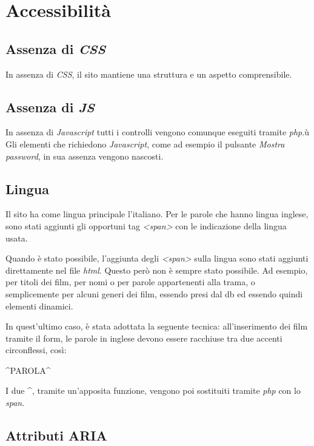 \documentclass[a4paper]{article}
\begin{document}
\section{Accessibilità}

\subsection{Assenza di \textit{CSS}}
In assenza di \textit{CSS}, il sito mantiene una struttura e un aspetto comprensibile.

\subsection{Assenza di \textit{JS}}
In assenza di \textit{Javascript} tutti i controlli vengono comunque eseguiti tramite \textit{php}.ù
Gli elementi che richiedono \textit{Javascript}, come ad esempio il pulsante \textit{Mostra password}, in sua assenza vengono nascosti.

\subsection{Lingua}

Il sito ha come lingua principale l'italiano. Per le parole che hanno lingua inglese, sono stati aggiunti gli opportuni tag \textit{<span>} con le indicazione della lingua usata.

Quando è stato possibile, l'aggiunta degli \textit{<span>} sulla lingua sono stati aggiunti direttamente nel file \textit{html}. Questo però non è sempre stato possibile. Ad esempio, per titoli dei film, per nomi o per parole appartenenti alla trama, o semplicemente per alcuni generi dei film, essendo presi dal db ed essendo quindi elementi dinamici.

In quest'ultimo caso, è stata adottata la seguente tecnica: all'inserimento dei film tramite il form, le parole in inglese devono essere racchiuse tra due accenti circonflessi, così:

\textbf{\^{}}PAROLA\textbf{\^{}}

I due \textbf{\^{}}, tramite un'apposita funzione, vengono poi sostituiti tramite \textit{php} con lo \textit{span}.

\subsection{Attributi ARIA}
\end{document}
